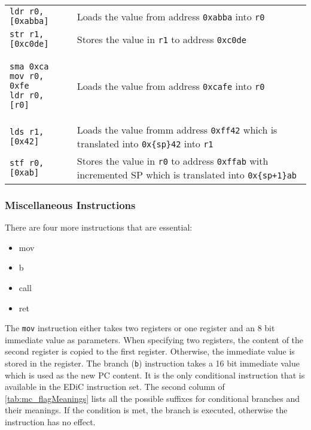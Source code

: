 \begin{tabular}{m{}m{}}
  \texttt{ldr r0, [0xabba]} & Loads the value from address \texttt{0xabba} into \texttt{r0}                                                                       \\
  \texttt{str r1, [0xc0de]} & Stores the value in \texttt{r1} to address \texttt{0xc0de}                                                                          \\
  \begin{verbatim}
sma 0xca
mov r0, 0xfe
ldr r0, [r0]
  \end{verbatim}
                                     & Loads the value from address \texttt{0xcafe} into \texttt{r0}                                                                       \\
  \texttt{lds r1, [0x42]}   & Loads the value fromm address \texttt{0xff42} which is translated into \texttt{0x\{sp\}42} into \texttt{r1}                         \\
  \texttt{stf r0, [0xab]}   & Stores the value in \texttt{r0} to address \texttt{0xffab} with incremented \gls{SP} which is translated into \texttt{0x\{sp+1\}ab} \\
\end{tabular}

\subsubsection{Miscellaneous Instructions}
There are four more instructions that are essential:

\begin{multicols}{4}
  \begin{itemize}
    \item mov
    \item b
    \item call
    \item ret
  \end{itemize}
\end{multicols}
The \texttt{mov} instruction either takes two registers or one register and an 8 bit immediate value as parameters.
When specifying two registers, the content of the second register is copied to the first register.
Otherwise, the immediate value is stored in the register.
The branch (\texttt{b}) instruction takes a 16 bit immediate value which is used as the new \gls{PC} content.
It is the only conditional instruction that is available in the \gls{EDiC} instruction set.
The second column of \cref{tab:mc_flagMeanings} lists all the possible suffixes for conditional branches and their meanings.
If the condition is met, the branch is executed, otherwise the instruction has no effect.

